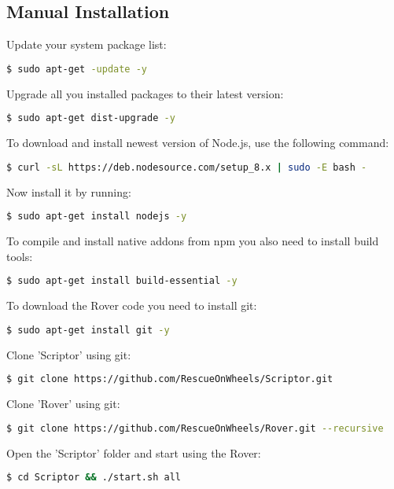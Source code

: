\subsection{Manual Installation}

Update your system package list:
\begin{lstlisting}[language=bash]
  $ sudo apt-get -update -y
\end{lstlisting}

Upgrade all you installed packages to their latest version:
\begin{lstlisting}[language=bash]
  $ sudo apt-get dist-upgrade -y
\end{lstlisting}

To download and install newest version of Node.js, use the following command:
\begin{lstlisting}[language=bash]
  $ curl -sL https://deb.nodesource.com/setup_8.x | sudo -E bash -
\end{lstlisting}

Now install it by running: 
\begin{lstlisting}[language=bash]
  $ sudo apt-get install nodejs -y
\end{lstlisting}

To compile and install native addons from npm you also need to install build tools: 
\begin{lstlisting}[language=bash]
  $ sudo apt-get install build-essential -y
\end{lstlisting}

To download the Rover code you need to install git: 
\begin{lstlisting}[language=bash]
  $ sudo apt-get install git -y
\end{lstlisting}

Clone 'Scriptor' using git: 
\begin{lstlisting}[language=bash]
  $ git clone https://github.com/RescueOnWheels/Scriptor.git
\end{lstlisting}

Clone 'Rover' using git: 
\begin{lstlisting}[language=bash]
  $ git clone https://github.com/RescueOnWheels/Rover.git --recursive
\end{lstlisting}

Open the 'Scriptor' folder and start using the Rover: 
\begin{lstlisting}[language=bash]
  $ cd Scriptor && ./start.sh all
\end{lstlisting}